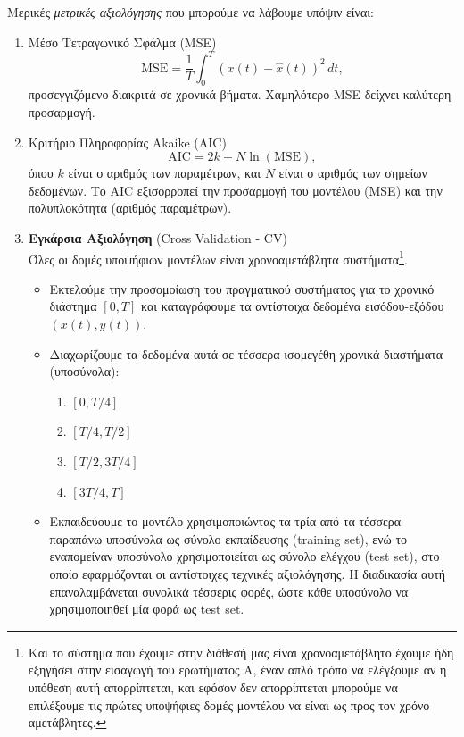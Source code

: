 \documentclass[12pt]{article} %
\numberwithin{equation}{section}  %
\begin{document}
Μερικές \textit{μετρικές αξιολόγησης} που μπορούμε να λάβουμε υπόψιν είναι:
\begin{enumerate}
    \item Μέσο Τετραγωνικό Σφάλμα (MSE) \\
        \[
        \text{MSE} = \frac{1}{T} \int_0^T (x(t) - \hat{x}(t))^2 \, dt,
        \]
        προσεγγιζόμενο διακριτά σε χρονικά βήματα. Χαμηλότερο MSE δείχνει καλύτερη προσαρμογή.
    
    \item Κριτήριο Πληροφορίας Akaike (AIC) \\
        \[
        \text{AIC} = 2k + N \ln(\text{MSE}),
        \]
        όπου \(k\) είναι ο αριθμός των παραμέτρων, και \(N\) είναι ο αριθμός των σημείων δεδομένων. Το AIC εξισορροπεί την προσαρμογή του μοντέλου (MSE) και την πολυπλοκότητα (αριθμός παραμέτρων).
        
    \item \textbf{Εγκάρσια Αξιολόγηση} (Cross Validation - CV) \\
        Όλες οι δομές υποψήφιων μοντέλων είναι χρονοαμετάβλητα συστήματα\footnote{
        Και το σύστημα που έχουμε στην διάθεσή μας είναι χρονοαμετάβλητο\textemdash 
        έχουμε ήδη εξηγήσει στην εισαγωγή του ερωτήματος Α, έναν απλό τρόπο να ελέγξουμε αν η υπόθεση αυτή απορρίπτεται, 
        και εφόσον δεν απορρίπτεται μπορούμε να επιλέξουμε τις πρώτες υποψήφιες δομές μοντέλου 
        να είναι ως προς τον χρόνο αμετάβλητες.
        }. 
        \begin{itemize}[nolistsep, noitemsep]
            \item Εκτελούμε την προσομοίωση του πραγματικού συστήματος για το χρονικό διάστημα $[0, T]$ 
            και καταγράφουμε τα αντίστοιχα δεδομένα εισόδου-εξόδου $(x(t), y(t))$.

            \item Διαχωρίζουμε τα δεδομένα αυτά σε τέσσερα ισομεγέθη χρονικά διαστήματα (υποσύνολα):
            \begin{enumerate}
                \item $[0, T/4]$
                \item $[T/4, T/2]$
                \item $[T/2, 3T/4]$
                \item $[3T/4, T]$
            \end{enumerate}

            \item Εκπαιδεύουμε το μοντέλο χρησιμοποιώντας τα τρία από τα τέσσερα παραπάνω υποσύνολα ως σύνολο εκπαίδευσης (training set), 
            ενώ το εναπομείναν υποσύνολο χρησιμοποιείται ως σύνολο ελέγχου (test set), 
            στο οποίο εφαρμόζονται οι αντίστοιχες τεχνικές αξιολόγησης. 
            Η διαδικασία αυτή επαναλαμβάνεται συνολικά τέσσερις φορές, ώστε κάθε υποσύνολο να χρησιμοποιηθεί 
            μία φορά ως test set.
        \end{itemize}
        
\end{enumerate}



\newpage
\end{document}
